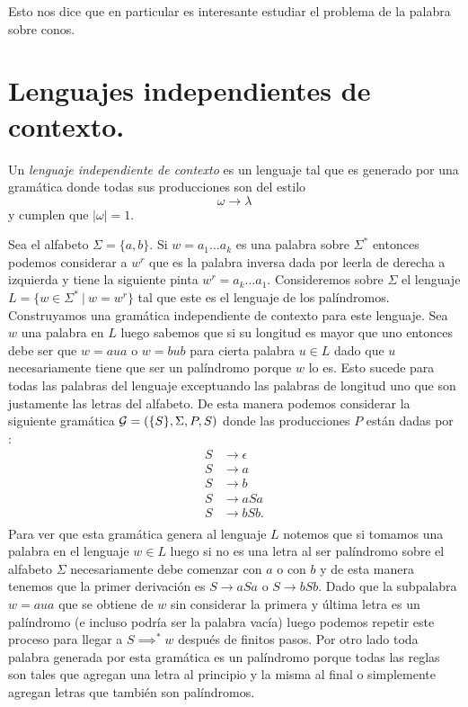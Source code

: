 \documentclass[tesis.tex]{subfiles}
\begin{document}
Esto nos dice que en particular es interesante estudiar el problema de la palabra sobre conos. 

\section{Lenguajes independientes de contexto.}


Un \textit{lenguaje independiente de contexto} es un lenguaje tal que es generado por una gramática donde todas sus producciones son del estilo
\[
 \omega \to \lambda
\]
y cumplen que $|\omega| = 1$. 

\begin{ej}
	Sea el alfabeto $\Sigma = \{ a,b \}$. Si $w=a_1 \dots a_k$ es una palabra sobre $\Sigma^*$ entonces podemos considerar a $w^r$ que es la palabra inversa dada por leerla de derecha a izquierda y tiene la siguiente pinta $w^r= a_k \dots a_1$. Consideremos sobre $\Sigma$ el lenguaje $L = \{ w \in \Sigma^* \ | \ w = w^r  \}$ tal que este es el lenguaje de los palíndromos. Construyamos una gramática independiente de contexto para este lenguaje. Sea $w$ una palabra en $L$ luego sabemos que si su longitud es mayor que uno entonces debe ser que $w = a u a$ o $w = b u b$ para cierta palabra $u \in L$ dado que $u$ necesariamente tiene que ser un palíndromo porque $w$ lo es. Esto sucede para todas las palabras del lenguaje exceptuando las palabras de longitud uno que son justamente las letras del alfabeto. De esta manera podemos considerar la siguiente gramática ${\cal G}  =  (\{S\}, \Sigma, P, S )$ donde las producciones $P$ están dadas por :
	\begin{align*}
	S  & \to \epsilon \\ S &\to a \\ S &\to b \\ S &\to  aSa \\ S &\to bSb. \\
	\end{align*}
	Para ver que esta gramática genera al lenguaje $L$ notemos que si tomamos una palabra en el lenguaje $w \in L$ luego si no es una letra al ser palíndromo sobre el alfabeto $\Sigma$ necesariamente debe comenzar con $a$ o con $b$ y de esta manera tenemos que la primer derivación es $S \to aSa$ o $S \to bSb$. Dado que la subpalabra $w = aua$ que se obtiene de $w$ sin considerar la primera y última letra es un palíndromo (e incluso podría ser la palabra vacía) luego podemos repetir este proceso para llegar a $S \implies^* w$ después de finitos pasos. Por otro lado toda palabra generada por esta gramática es un palíndromo porque todas las reglas son tales que agregan una letra al principio y la misma al final o simplemente agregan letras que también son palíndromos.
	
\end{ej}
\end{document}
